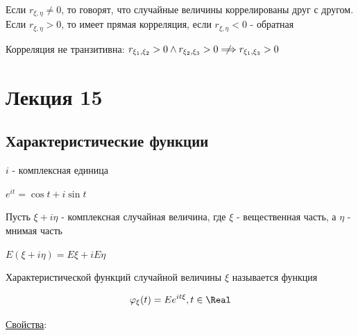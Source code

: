 \documentclass[12pt]{article}
\begin{document}
\Def Если $r_{\xi,\eta} \neq 0$, то говорят, что случайные величины коррелированы друг с другом. Если $r_{\xi,\eta} > 0$, 
то имеет прямая корреляция, если $r_{\xi,\eta} < 0$ - обратная

\Nota Корреляция не транзитивна: $r_{\xi_1,\xi_2} > 0 \land r_{\xi_2,\xi_3} > 0 \centernot\Longrightarrow r_{\xi_1,\xi_3} > 0$






\section{Лекция 15}

\subsection{Характеристические функции}

\Mem $i$ - комплексная единица

\Mems $e^{it} = \cos t + i \sin t$

Пусть $\xi + i\eta$ - комплексная случайная величина, где $\xi$ - вещественная часть, а $\eta$ - мнимая часть

\Def $E(\xi + i\eta) = E\xi + iE\eta$

\hypertarget{characteristicfunction}{}

\Def Характеристической функций случайной величины $\xi$ называется функция 

\[\varphi_\xi(t) = Ee^{it\xi}, t \in \Real\]

\underline{Свойства}:
\end{document}
